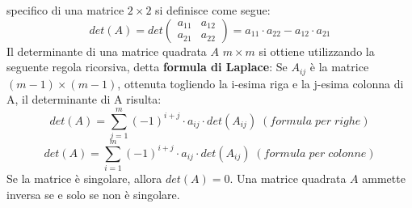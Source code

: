 \documentclass[12pt]{article}
\begin{document}
specifico di una matrice $2 \times 2$ si definisce come segue:
$$det(A) = det\begin{pmatrix}
    a_{11} & a_{12} \\
    a_{21} & a_{22}
\end{pmatrix} = a_{11} \cdot a_{22} - a_{12} \cdot a_{21}$$
Il determinante di una matrice quadrata $A$ $m \times m$ si ottiene utilizzando la seguente regola ricorsiva, detta \textbf{formula di Laplace}:
Se $A_{ij}$ è la matrice $(m-1) \times (m-1)$, ottenuta togliendo la i-esima riga e la j-esima colonna di A, il determinante di A risulta:
$$det(A) = \sum_{j=1}^{m} (-1)^{i+j} \cdot a_{ij} \cdot det(A_{ij}) \; (formula \; per \; righe)$$
$$det(A) = \sum_{i=1}^{m} (-1)^{i+j} \cdot a_{ij} \cdot det(A_{ij}) \; (formula \; per \; colonne)$$
Se la matrice è singolare, allora $det(A) = 0$. \newline
Una matrice quadrata $A$ ammette inversa se e solo se non è singolare.
\end{document}
